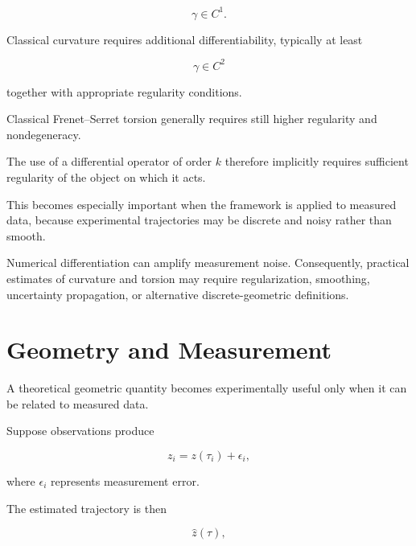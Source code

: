 \documentclass[12pt,oneside]{book}
\begin{document}
\begin{equation}
    \gamma
    \in
    C^1.
\end{equation}

Classical curvature requires additional differentiability,
typically at least

\begin{equation}
    \gamma
    \in
    C^2
\end{equation}

together with appropriate regularity conditions.

Classical Frenet--Serret torsion generally requires still higher
regularity and nondegeneracy.

The use of a differential operator of order \(k\) therefore
implicitly requires sufficient regularity of the object on which
it acts.

This becomes especially important when the framework is applied
to measured data, because experimental trajectories may be
discrete and noisy rather than smooth.

Numerical differentiation can amplify measurement noise.
Consequently, practical estimates of curvature and torsion may
require regularization, smoothing, uncertainty propagation, or
alternative discrete-geometric definitions.


\section{Geometry and Measurement}
\label{sec:geometry-measurement}

A theoretical geometric quantity becomes experimentally useful
only when it can be related to measured data.

Suppose observations produce

\begin{equation}
    z_i
    =
    z(\tau_i)
    +
    \epsilon_i,
    \label{eq:noisy-state-observation}
\end{equation}

where \(\epsilon_i\) represents measurement error.

The estimated trajectory is then

\begin{equation}
    \widehat{z}(\tau),
\end{equation}
\end{document}
